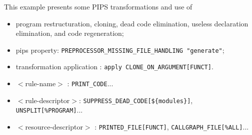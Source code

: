 \documentclass[a4paper,12pt]{article}
\begin{document}
This example presents some PIPS transformations and use of
\begin{itemize}
\item program restructuration, cloning, dead code elimination, useless
  declaration elimination, and code regeneration;
\item pips property: \verb+PREPROCESSOR_MISSING_FILE_HANDLING "generate"+;
\item transformation application : \verb+apply CLONE_ON_ARGUMENT[FUNCT]+.
\item $<$rule-name$>$ : \verb+PRINT_CODE+...
\item $<$rule-descriptor$>$:
  \verb+SUPPRESS_DEAD_CODE[${modules}]+,  \verb+UNSPLIT[%PROGRAM]+...
\item $<$resource-descriptor$>$ :  \verb+PRINTED_FILE[FUNCT]+,  \verb+CALLGRAPH_FILE[%ALL]+...
\end{itemize}
\end{document}
